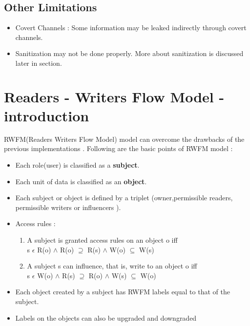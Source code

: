 \documentclass[11pt,a4paper]{report}
\begin{document}
\subsection{Other Limitations}
\begin{itemize}
\item Covert Channels : Some information may be leaked indirectly through covert channels.
\item Sanitization may not be done properly. More about sanitization is discussed later in section. 
\end{itemize}

\newpage
\section{Readers - Writers Flow Model - introduction}
RWFM(Readers Writers Flow Model) model can overcome the drawbacks of the previous implementations . Following are the basic points of RWFM model : \begin{itemize}
    \item Each role(user) is classified as a \textbf{subject}.
    \item Each unit of data is classified as an \textbf{object}.
    \item Each subject or object is defined by a triplet (owner,permissible readers, permissible writers or influencers ).
    \item Access rules : 
    \begin{enumerate}
        \item A subject is granted access rules on an object o iff \\  
        s $\epsilon$  R(o) $\wedge$ R(o) $\supseteq$ R(s) $\wedge$ W(o) $\subseteq$ W(s) 
        \item  A subject s can inﬂuence, that is, write to an object o iﬀ \\
        s $\epsilon$ W(o) $\wedge$ R(s) $\supseteq$ R(o) $\wedge$ W(s) $\subseteq$ W(o) 
        
    \end{enumerate}
    \item Each object created by a subject has RWFM labels equal to that of the subject.
    \item  Labels on the objects can also be upgraded and downgraded
\end{itemize}
\end{document}
